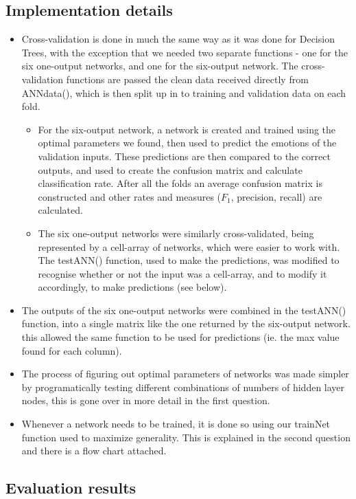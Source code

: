 \documentclass[12pt]{article}
\begin{document}
\subsection*{Implementation details}
\begin{itemize}
  \item Cross-validation is done in much the same way as it was done for Decision Trees, with the exception that we needed two separate functions - one for the six one-output networks, and one for the six-output network. The cross-validation functions are passed the clean data received directly from ANNdata(), which is then split up in to training and validation data on each fold.
  \begin{itemize}
    \item For the six-output network, a network is created and trained using the optimal parameters we found, then used to predict the emotions of the validation inputs. These predictions are then compared to the correct outputs, and used to create the confusion matrix and calculate classification rate. After all the folds an average confusion matrix is constructed and other rates and measures ($F_1$, precision, recall) are calculated.
    \item The six one-output networks were similarly cross-validated, being represented by a cell-array of networks, which were easier to work with. The testANN() function, used to make the predictions, was modified to recognise whether or not the input was a cell-array, and to modify it accordingly, to make predictions (see below).
  \end{itemize}
  \item The outputs of the six one-output networks were combined in the testANN() function, into a single matrix like the one returned by the six-output network. this allowed the same function to be used for predictions (ie. the max value found for each column).
  \item The process of figuring out optimal parameters of networks was made simpler by programatically testing different combinations of numbers of hidden layer nodes, this is gone over in more detail in the first question.
  \item Whenever a network needs to be trained, it is done so using our trainNet function used to maximize generality. This is explained in the second question and there is a flow chart attached.
\end{itemize}


\subsection*{Evaluation results}
\end{document}
